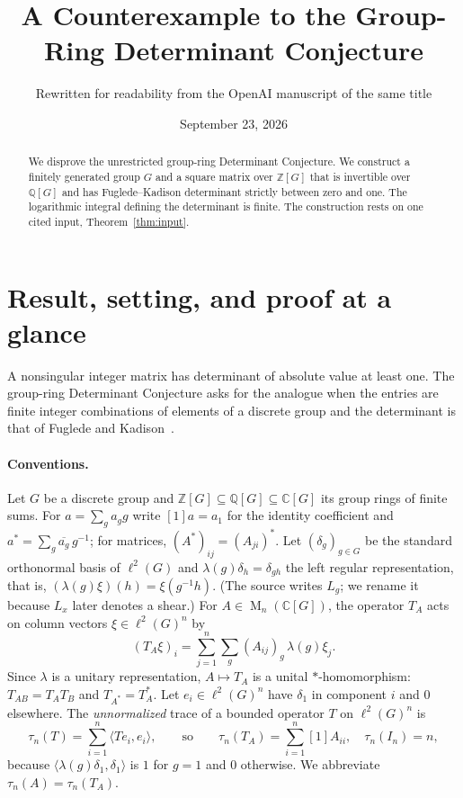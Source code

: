 \documentclass[11pt]{article}
\title{A Counterexample to the Group-Ring Determinant Conjecture}
\author{Rewritten for readability from the OpenAI manuscript of the same title}
\date{September 23, 2026}
\theoremstyle{remark}
\numberwithin{equation}{section}
\newcommand{\Z}{\mathbb Z}
\newcommand{\Q}{\mathbb Q}
\newcommand{\C}{\mathbb C}
\newcommand{\Mat}{\operatorname{M}}
\begin{document}
\maketitle
\begin{abstract}
We disprove the unrestricted group-ring Determinant Conjecture. We construct a finitely generated group $G$ and a square matrix over $\Z[G]$ that is invertible over $\Q[G]$ and has Fuglede--Kadison determinant strictly between zero and one. The logarithmic integral defining the determinant is finite. The construction rests on one cited input, Theorem~\ref{thm:input}.
\end{abstract}

\section{Result, setting, and proof at a glance}
\label{sec:introduction}

A nonsingular integer matrix has determinant of absolute value at least one. The group-ring Determinant Conjecture asks for the analogue when the entries are finite integer combinations of elements of a discrete group and the determinant is that of Fuglede and Kadison~\cite{FK1952}.

\paragraph{Conventions.}
Let $G$ be a discrete group and $\Z[G]\subseteq\Q[G]\subseteq\C[G]$ its group rings of finite sums. For $a=\sum_g a_gg$ write $[1]a=a_1$ for the identity coefficient and $a^*=\sum_g\overline{a_g}\,g^{-1}$; for matrices, $(A^*)_{ij}=(A_{ji})^*$. Let $(\delta_g)_{g\in G}$ be the standard orthonormal basis of $\ell^2(G)$ and $\lambda(g)\delta_h=\delta_{gh}$ the left regular representation, that is, $(\lambda(g)\xi)(h)=\xi(g^{-1}h)$. (The source writes $L_g$; we rename it because $L_x$ later denotes a shear.) For $A\in\Mat_n(\C[G])$, the operator $T_A$ acts on column vectors $\xi\in\ell^2(G)^n$ by
\[
 (T_A\xi)_i=\sum_{j=1}^n\sum_g(A_{ij})_g\,\lambda(g)\xi_j .
\]
Since $\lambda$ is a unitary representation, $A\mapsto T_A$ is a unital $*$-homomorphism: $T_{AB}=T_AT_B$ and $T_{A^*}=T_A^*$. Let $e_i\in\ell^2(G)^n$ have $\delta_1$ in component $i$ and $0$ elsewhere. The \emph{unnormalized} trace of a bounded operator $T$ on $\ell^2(G)^n$ is
\begin{equation}\label{eq:trace}
 \tau_n(T)=\sum_{i=1}^n\langle Te_i,e_i\rangle,
 \qquad\text{so}\qquad
 \tau_n(T_A)=\sum_{i=1}^n[1]A_{ii},\quad\tau_n(I_n)=n,
\end{equation}
because $\langle\lambda(g)\delta_1,\delta_1\rangle$ is $1$ for $g=1$ and $0$ otherwise. We abbreviate $\tau_n(A)=\tau_n(T_A)$.
\end{document}
